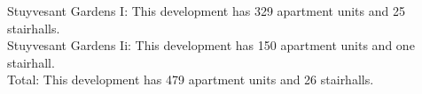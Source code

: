{Stuyvesant Gardens I}: This development has 329 apartment units and 25 stairhalls.\\{Stuyvesant Gardens Ii}: This development has 150 apartment units and one stairhall.\\{Total}: This development has 479 apartment units and 26 stairhalls.\\